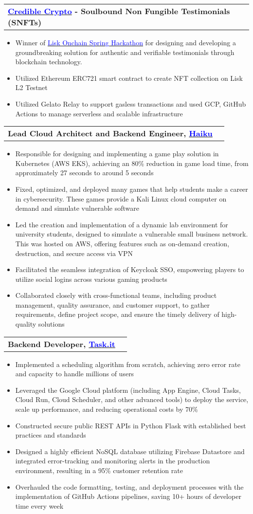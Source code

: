 \documentclass[letterpaper,11pt]{article}
\makeatletter
\newcommand{\resumeItem}[1]{
  \item\small{
    {#1 \vspace{-2pt}}
  }
}
\newcommand{\resumeProjectHeading}[2]{
    \vspace{-2pt}\item
    \begin{tabular*}{0.97\textwidth}{l@{\extracolsep{\fill}}r}
      \small#1 & #2 \\
    \end{tabular*}\vspace{-7pt}
}
\newcommand{\resumeItemListStart}{\begin{itemize}}
\newcommand{\resumeItemListEnd}{\end{itemize}\vspace{-5pt}}
\makeatother
\begin{document}
\resumeProjectHeading
{\textbf{{\href{https://devpost.com/software/credible-crypto}{\textcolor{blue}{Credible Crypto}}} - Soulbound Non Fungible Testimonials (SNFTs)} \emph}{}
\resumeItemListStart
\resumeItem{Winner of {\href{https://lisk.devpost.com/}{\textcolor{blue}{Lisk Onchain Spring Hackathon}}} for designing and developing a groundbreaking solution for authentic and verifiable testimonials through blockchain technology.}
\resumeItem{Utilized Ethereum ERC721 smart contract to create NFT collection on Lisk L2 Testnet}
\resumeItem{Utilized Gelato Relay to support gasless transactions and used GCP, GitHub Actions to manage serverless and scalable infrastructure}
\resumeItemListEnd

\resumeProjectHeading
{\textbf{Lead Cloud Architect and Backend Engineer, {\href{https://haikuinc.io/}{\textcolor{blue}{Haiku}}}} \emph}{}
\resumeItemListStart
\resumeItem{Responsible for designing and implementing a game play solution in Kubernetes (AWS EKS), achieving an 80\% reduction in game load time, from approximately 27 seconds to around 5 seconds}
\resumeItem{Fixed, optimized, and deployed many games that help students make a career in cybersecurity. These games provide a Kali Linux cloud computer on demand and simulate vulnerable software}
\resumeItem{Led the creation and implementation of a dynamic lab environment for university students, designed to simulate a vulnerable small business network. This was hosted on AWS, offering features such as on-demand creation, destruction, and secure access via VPN}
\resumeItem{Facilitated the seamless integration of Keycloak SSO, empowering players to utilize social logins across various gaming products}
\resumeItem{Collaborated closely with cross-functional teams, including product management, quality assurance, and customer support, to gather requirements, define project scope, and ensure the timely delivery of high-quality solutions}
\resumeItemListEnd

\resumeProjectHeading
{\textbf{Backend Developer, {\href{https://www.task.it/}{\textcolor{blue}{Task.it}}}} \emph}{}
\resumeItemListStart
\resumeItem{Implemented a scheduling algorithm from scratch, achieving zero error rate and capacity to handle millions of users} %
\resumeItem{Leveraged the Google Cloud platform (including App Engine, Cloud Tasks, Cloud Run, Cloud Scheduler, and other advanced tools) to deploy the service, scale up performance, and reducing operational costs by 70\%} %
\resumeItem {Constructed secure public REST APIs in Python Flask with established best practices and standards} %
\resumeItem{Designed a highly efficient NoSQL database utilizing Firebase Datastore and integrated error-tracking and monitoring alerts in the production environment, resulting in a 95\% customer retention rate} %
\resumeItem{Overhauled the code formatting, testing, and deployment processes with the implementation of GitHub Actions pipelines, saving 10+ hours of developer time every week} %
\resumeItemListEnd
\end{document}
